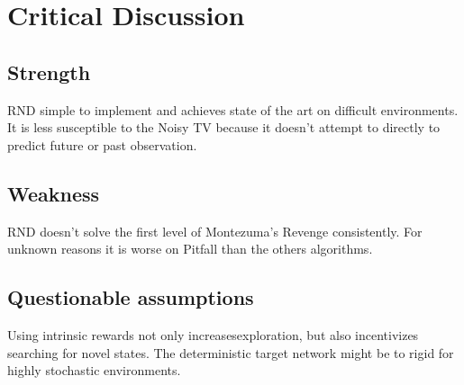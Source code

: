 \documentclass[11pt,a4paper]{article}
\begin{document}
\section{Critical Discussion}
\subsection{Strength}
RND simple to implement and achieves state of the art on difficult environments. It is less susceptible to the Noisy TV because it doesn't
attempt to directly to predict future or past observation. 


\subsection{Weakness} 
RND doesn't solve the first level of Montezuma's Revenge consistently. For unknown reasons it is worse on Pitfall than the others algorithms.

\subsection{Questionable assumptions} 
Using intrinsic rewards not only increasesexploration, but also incentivizes searching for novel states. 
The deterministic target network might be to rigid for highly stochastic environments.
\end{document}
